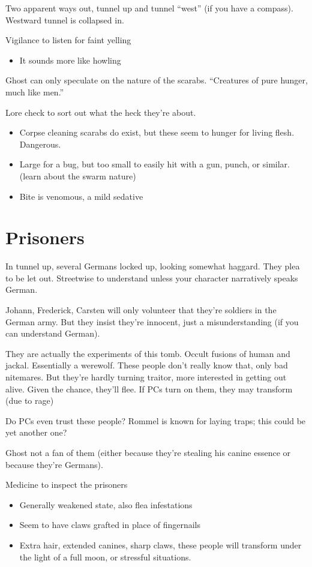 \documentclass[background]{book}
\newcommand{\df}{\DifficultyDie}
\newcommand{\stb}{\SetbackDie}
\begin{document}
\begin{multicols}{2}
Two apparent ways out, tunnel up and tunnel ``west'' (if you have a compass).  Westward tunnel is collapsed in.

\df\df\df Vigilance to listen for faint yelling
\begin{itemize}
    \item \Advantage It sounds more like howling
\end{itemize}

Ghost can only speculate on the nature of the scarabs.  ``Creatures of pure hunger, much like men.''

\df\df\df Lore check to sort out what the heck they're about.
    \begin{itemize}
        \item \Success Corpse cleaning scarabs do exist, but these seem to hunger for living flesh.  Dangerous.
        \item \Advantage Large for a bug, but too small to easily hit with a gun, punch, or similar.  (learn about the swarm nature)
        \item \Advantage Bite is venomous, a mild sedative
    \end{itemize}

\section{Prisoners}

In tunnel up, several Germans locked up, looking somewhat haggard.  They plea to be let out.  \df\df Streetwise to understand unless your character narratively speaks German.

Johann, Frederick, Carsten will only volunteer that they're soldiers in the German army.  But they insist they're innocent, just a misunderstanding (if you can understand German).

They are actually the experiments of this tomb.  Occult fusions of human and jackal.  Essentially a werewolf.  These people don't really know that, only bad nitemares.  But they're hardly turning traitor, more interested in getting out alive.  Given the chance, they'll flee.  If PCs turn on them, they may transform (due to rage)

Do PCs even trust these people?  Rommel is known for laying traps; this could be yet another one?

Ghost not a fan of them (either because they're stealing his canine essence or because they're Germans).

\df\df\stb\stb Medicine to inspect the prisoners
    \begin{itemize}
        \item \Success Generally weakened state, also flea infestations
        \item \Advantage\Advantage Seem to have claws grafted in place of fingernails
        \item \Triumph Extra hair, extended canines, sharp claws, these people will transform under the light of a full moon, or stressful situations.
    \end{itemize}



\end{multicols}
\end{document}
